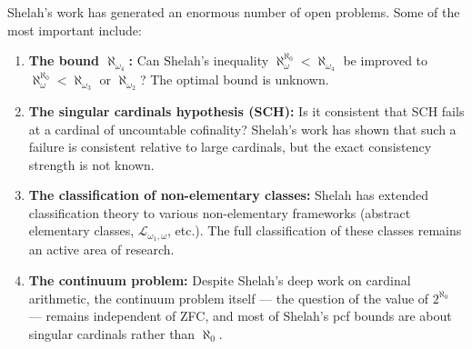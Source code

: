 Shelah's work has generated an enormous number of open problems. Some of the most important include:
\begin{enumerate}
    \item \textbf{The bound \(\aleph_{\omega_4}\):} Can Shelah's inequality \(\aleph_\omega^{\aleph_0} < \aleph_{\omega_4}\) be improved to \(\aleph_\omega^{\aleph_0} < \aleph_{\omega_3}\) or \(\aleph_{\omega_2}\)? The optimal bound is unknown.
    \item \textbf{The singular cardinals hypothesis (SCH):} Is it consistent that SCH fails at a cardinal of uncountable cofinality? Shelah's work has shown that such a failure is consistent relative to large cardinals, but the exact consistency strength is not known.
    \item \textbf{The classification of non-elementary classes:} Shelah has extended classification theory to various non-elementary frameworks (abstract elementary classes, \(\mathcal{L}_{\omega_1,\omega}\), etc.). The full classification of these classes remains an active area of research.
    \item \textbf{The continuum problem:} Despite Shelah's deep work on cardinal arithmetic, the continuum problem itself --- the question of the value of \(2^{\aleph_0}\) --- remains independent of ZFC, and most of Shelah's pcf bounds are about singular cardinals rather than \(\aleph_0\).
\end{enumerate}

